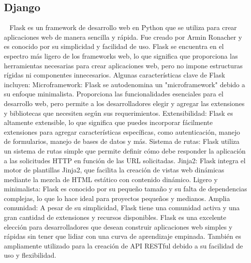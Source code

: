 \subsection{Django}~\cite{burch2010django}
Flask es un framework de desarrollo web en Python que se utiliza para crear aplicaciones web de manera sencilla y rápida. Fue creado por Armin Ronacher y es conocido por su simplicidad y facilidad de uso. Flask se encuentra en el espectro más ligero de los frameworks web, lo que significa que proporciona las herramientas necesarias para crear aplicaciones web, pero no impone estructuras rígidas ni componentes innecesarios.
Algunas características clave de Flask incluyen:
Microframework: Flask se autodenomina un "microframework" debido a su enfoque minimalista. Proporciona las funcionalidades esenciales para el desarrollo web, pero permite a los desarrolladores elegir y agregar las extensiones y bibliotecas que necesiten según sus requerimientos.
Extensibilidad: Flask es altamente extensible, lo que significa que puedes incorporar fácilmente extensiones para agregar características específicas, como autenticación, manejo de formularios, manejo de bases de datos y más.
Sistema de rutas: Flask utiliza un sistema de rutas simple que permite definir cómo debe responder la aplicación a las solicitudes HTTP en función de las URL solicitadas.
Jinja2: Flask integra el motor de plantillas Jinja2, que facilita la creación de vistas web dinámicas mediante la mezcla de HTML estático con contenido dinámico.
Ligero y minimalista: Flask es conocido por su pequeño tamaño y su falta de dependencias complejas, lo que lo hace ideal para proyectos pequeños y medianos.
Amplia comunidad: A pesar de su simplicidad, Flask tiene una comunidad activa y una gran cantidad de extensiones y recursos disponibles.
Flask es una excelente elección para desarrolladores que desean construir aplicaciones web simples y rápidas sin tener que lidiar con una curva de aprendizaje empinada. También es ampliamente utilizado para la creación de API RESTful debido a su facilidad de uso y flexibilidad.

